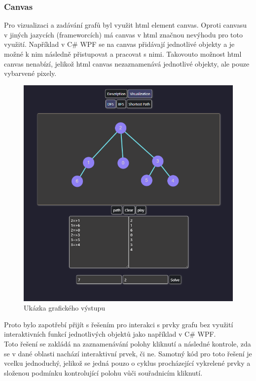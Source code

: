 \documentclass[12pt, titlepage, a4paper]{article}
\begin{document}
\subsubsection{Canvas}
Pro vizualizaci a zadávání grafů byl využit html element canvas. Oproti 
canvasu v jiných jazycích (frameworcích) má canvas v html značnou nevýhodu
pro toto využití. Například v C\# WPF se na canvas přidávají jednotlivé objekty
a je možné k nim následně přistupovat a pracovat s nimi. Takovouto možnost html 
canvas nenabízí, jelikož html canvas nezaznamenává jednotlivé objekty, ale pouze
vybarvené pixely.
\\
\begin{figure}[h]
    \includegraphics[scale=0.8]{files/Vystup.png}
    \caption{Ukázka grafického výstupu}
\end{figure}


Proto bylo zapotřebí přijít s řešením pro interakci s prvky grafu bez využití
interaktivních funkcí jednotlivých objektů jako například v C\# WPF.
\\

Toto řešení se zakládá na zaznamenávání polohy kliknutí a následné kontrole, zda
se v dané oblasti nachází interaktivní prvek, či ne. Samotný kód pro toto řešení
je vcelku jednoduchý, jelikož se jedná pouzo o cyklus procházející vykrelené prvky
a složenou podmínku kontrolující polohu vůči souřadnicím kliknutí.
\end{document}
